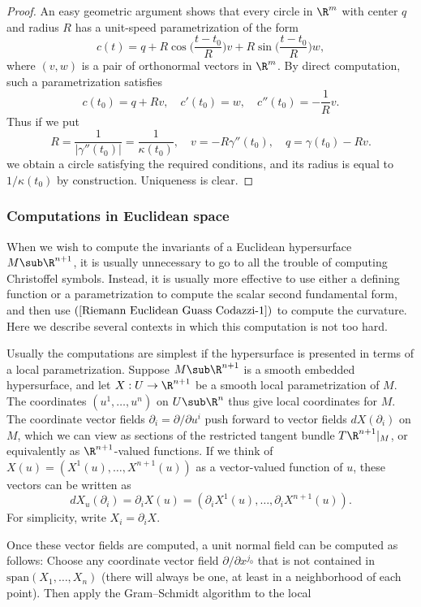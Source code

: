 \begin{proof}
An easy geometric argument shows that every circle in $\R^m$ with center $q$ and radius $R$ has a unit-speed parametrization of the form
\[c(t)=q+R\cos\Big(\frac{t-t_0}{R}\Big)v+R\sin\Big(\frac{t-t_0}{R}\Big)w,\]
where $(v,w)$ is a pair of orthonormal vectors in $\R^m$. By direct computation, such a parametrization satisfies
\[c(t_0)=q+Rv,\quad c'(t_0)=w,\quad c''(t_0)=-\frac{1}{R}v.\]
Thus if we put
\[R=\frac{1}{|\gamma''(t_0)|}=\frac{1}{\kappa(t_0)},\quad v=-R\gamma''(t_0),\quad q=\gamma(t_0)-Rv.\]
we obtain a circle satisfying the required conditions, and its radius is equal to $1/\kappa(t_0)$ by construction. Uniqueness is clear.
\end{proof}
\subsubsection{Computations in Euclidean space}
When we wish to compute the invariants of a Euclidean hypersurface $M\sub\R^{n+1}$, it is usually unnecessary to go to all the trouble of computing Christoffel symbols. 
Instead, it is usually more effective to use either a defining function or a parametrization to compute the scalar second fundamental form, and then use $(\ref{Riemann Euclidean Guass Codazzi-1})$ to 
compute the curvature. Here we describe several contexts in which this computation is not too hard.\par
Usually the computations are simplest if the hypersurface is presented in terms of a local parametrization. Suppose $M\sub\R^{n+1}$ is a smooth embedded hypersurface, 
and let $X:U\to\R^{n+1}$ be a smooth local parametrization of $M$. The coordinates $(u^1,\dots,u^n)$ on $U\sub\R^n$ thus give local coordinates for $M$. The coordinate 
vector fields $\partial_i=\partial/\partial u^i$ push forward to vector fields $dX(\partial_i)$ on $M$, which we can view as sections of the restricted tangent bundle 
$T\R^{n+1}|_M$, or equivalently as $\R^{n+1}$-valued functions. If we think of $X(u)=(X^1(u),\dots,X^{n+1}(u))$ as a vector-valued function of $u$, these vectors can be 
written as
\[dX_u(\partial_i)=\partial_iX(u)=(\partial_iX^1(u),\dots,\partial_iX^{n+1}(u)).\]
For simplicity, write $X_i=\partial_iX$.\par
Once these vector fields are computed, a unit normal field can be computed as follows: Choose any coordinate vector field $\partial/\partial x^{j_0}$ that is not 
contained in $\mathrm{span}(X_1,\dots,X_n)$ (there will always be one, at least in a neighborhood of each point). Then apply the Gram–Schmidt algorithm to the local 
